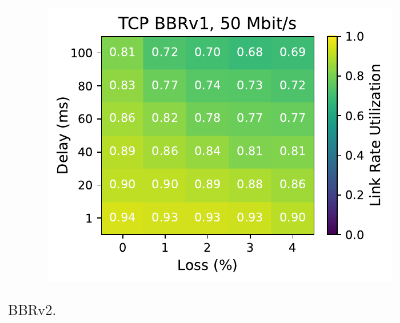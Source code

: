 \begin{figure}[ht]
\begin{subfigure}[b]{0.89cm}
        \includegraphics[width=\linewidth,trim={8cm 0 0 0},clip]{splitting-paper/figures/heatmaps/heatmap_tcp_bbr1_50mbps.pdf}
        \vspace*{0.2cm}
    \end{subfigure}
    \caption{BBRv2.}
\end{figure}

